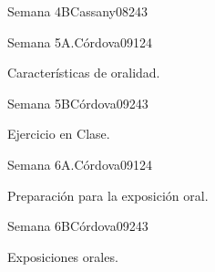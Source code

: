 \begin{syllabus}
\begin{unit}{Semana 4B}{Cassany08}{24}{3}
   \begin{learningoutcomes}
      \item 
      \item
      \item 
      \end{learningoutcomes}
\end{unit}


\begin{unit}{Semana 5A.}{Córdova09}{12}{4}
   \begin{topics}
      \item Características de oralidad.
   \end{topics}
   \begin{learningoutcomes}
      \item 
   \end{learningoutcomes}
\end{unit}

\begin{unit}{Semana 5B}{Córdova09}{24}{3}
   \begin{topics}
      \item Ejercicio en Clase.
   \end{topics}

   \begin{learningoutcomes}
      \item 
      \item
      \item 
      \end{learningoutcomes}
\end{unit}

\begin{unit}{Semana 6A.}{Córdova09}{12}{4}
   \begin{topics}
      \item Preparación para la exposición oral. 
   \end{topics}
   \begin{learningoutcomes}
      \item 
   \end{learningoutcomes}
\end{unit}

\begin{unit}{Semana 6B}{Córdova09}{24}{3}
   \begin{topics}
      \item Exposiciones orales.
   \end{topics}

   \begin{learningoutcomes}
      \item 
      \item
      \item 
      \end{learningoutcomes}
\end{unit}



\end{syllabus}
